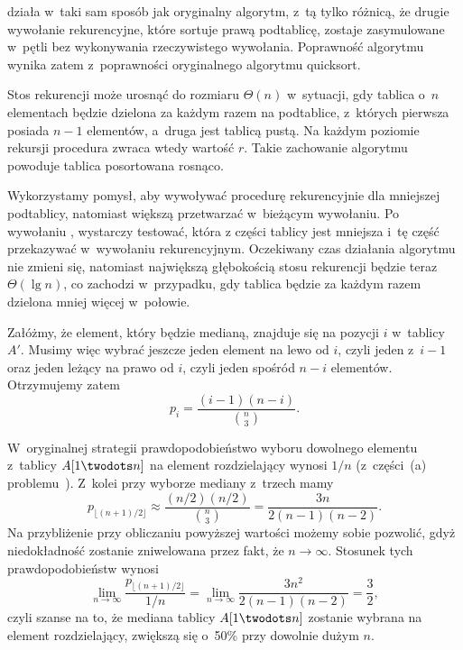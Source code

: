 \subproblem %
 działa w~taki sam sposób jak oryginalny algorytm, z~tą tylko różnicą, że drugie wywołanie rekurencyjne, które sortuje prawą podtablicę, zostaje zasymulowane w~pętli bez wykonywania rzeczywistego wywołania. Poprawność algorytmu wynika zatem z~poprawności oryginalnego algorytmu quicksort.

\subproblem %
Stos rekurencji może urosnąć do rozmiaru $\Theta(n)$ w~sytuacji, gdy tablica o~$n$ elementach będzie dzielona za każdym razem na podtablice, z~których pierwsza posiada $n-1$ elementów, a~druga jest tablicą pustą. Na każdym poziomie rekursji procedura  zwraca wtedy wartość $r$. Takie zachowanie algorytmu powoduje tablica posortowana rosnąco.

\subproblem %
Wykorzystamy pomysł, aby wywoływać procedurę rekurencyjnie dla mniejszej podtablicy, natomiast większą przetwarzać w~bieżącym wywołaniu. Po wywołaniu , wystarczy testować, która z części tablicy jest mniejsza i~tę część przekazywać w~wywołaniu rekurencyjnym. Oczekiwany czas działania algorytmu nie zmieni się, natomiast największą głębokością stosu rekurencji będzie teraz $\Theta(\lg n)$, co zachodzi w~przypadku, gdy tablica będzie za każdym razem dzielona mniej więcej w~połowie.


\subproblem %
Załóżmy, że element, który będzie medianą, znajduje się na pozycji $i$ w~tablicy $A'$. Musimy więc wybrać jeszcze jeden element na lewo od $i$, czyli jeden z~$i-1$ oraz jeden leżący na prawo od $i$, czyli jeden spośród $n-i$ elementów. Otrzymujemy zatem
\[
	p_i = \frac{(i-1)(n-i)}{\binom{n}{3}}.
\]

\subproblem %
W~oryginalnej strategii prawdopodobieństwo wyboru dowolnego elementu z~tablicy $A[1\twodots n]$ na element rozdzielający wynosi $1/n$ (z~części~(a) problemu~). Z~kolei przy wyborze mediany z~trzech mamy
\[
	p_{\lfloor(n+1)/2\rfloor} \approx \frac{(n/2)(n/2)}{\binom{n}{3}} = \frac{3n}{2(n-1)(n-2)}.
\]
Na przybliżenie przy obliczaniu powyższej wartości możemy sobie pozwolić, gdyż niedokładność zostanie zniwelowana przez fakt, że $n\to\infty$. Stosunek tych prawdopodobieństw wynosi
\[
	\lim_{n\to\infty}\frac{p_{\lfloor(n+1)/2\rfloor}}{1/n} = \lim_{n\to\infty}\frac{3n^2}{2(n-1)(n-2)} = \frac{3}{2},
\]
czyli szanse na to, że mediana tablicy $A[1\twodots n]$ zostanie wybrana na element rozdzielający, zwiększą się o~50\% przy dowolnie dużym $n$.

